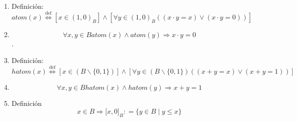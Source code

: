 \begin{enumerate}
\begin{enumerate}
\begin{enumerate}
\begin{enumerate}
        \begin{enumerate}
        \def\labelenumv{\arabic{enumv}.}
        \tightlist
        \item
          \[x,{y \in B}{{x \geq {y \land y}} \geq x}\]
        \item
          \[x,{y \in B}{{{x + y} = {{y \land x} + y}} = x}\]
        \item
          \[x,{y \in B}{x = y}\]
        \end{enumerate}
      \item
        Transitiva:
        \[\forall x,y,{z \in B}{{x \geq {y \land y}} \geq z}\Rightarrow{x \geq z}\]

        \begin{enumerate}
        \def\labelenumv{\arabic{enumv}.}
        \tightlist
        \item
          \[{x \geq {y \land y}} \geq z\]
        \item
          \[{{x + y} = {{x \land y} + z}} = y\]
        \item
          \[{{x + y} + z} = {x + z}\]
        \item
          \[{x + y} = {x + z}\]
        \item
          \[x = {x + z}\]
        \item
          \[x \geq z\]
        \end{enumerate}
      \end{enumerate}
    \item
      Definición:\[\mathit{atom}{(x)}\overset{\text{def}}{\Leftrightarrow}{\left\lbrack {x \in (1,0)_{B}} \right\rbrack \land \left\lbrack {\forall{y \in (1,0)_{B}}\left( {\left( {{x \cdot y} = x} \right) \vee \left( {{x \cdot y} = 0} \right)} \right)} \right\rbrack}\]
    \item
      \[\forall x,{y \in B}\mathit{atom}{{(x)} \land \mathit{atom}}{(y)}\Rightarrow{{x \cdot y} = 0}\].
    \item
      Definición:\[\mathit{hatom}{(x)}\overset{\text{def}}{\Leftrightarrow}{\left\lbrack {x \in \left( {B \smallsetminus {\{ 0,1\}}} \right)} \right\rbrack \land \left\lbrack {\forall{y \in \left( {B \smallsetminus {\{ 0,1\}}} \right)}\left( {\left( {{x + y} = x} \right) \vee \left( {{x + y} = 1} \right)} \right)} \right\rbrack}\]
    \item
      \[\forall x,{y \in B}\mathit{hatom}{{(x)} \land \mathit{hatom}}{(y)}\Rightarrow{{x + y} = 1}\]
    \item
      Definición\[{x \in B}\Rightarrow{\lbrack{x,0}\rbrack}_{B}{: = {\{{{y \in B} \mid {y \leq x}}\}}}\]

\end{enumerate}
\end{enumerate}
\end{enumerate}
